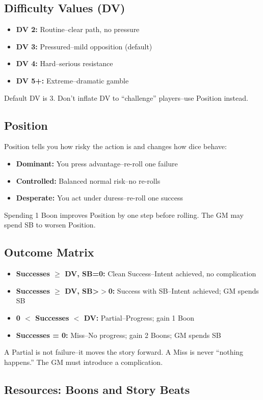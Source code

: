 \subsection{Difficulty Values (DV)}
\begin{itemize}
  \item \textbf{DV 2:} Routine--clear path, no pressure
  \item \textbf{DV 3:} Pressured--mild opposition (default)
  \item \textbf{DV 4:} Hard--serious resistance
  \item \textbf{DV 5+:} Extreme--dramatic gamble
\end{itemize}
Default DV is 3. Don't inflate DV to ``challenge'' players--use Position instead.

\subsection{Position}
Position tells you how risky the action is and changes how dice behave:
\begin{itemize}
  \item \textbf{Dominant:} You press advantage--re-roll one failure
  \item \textbf{Controlled:} Balanced normal risk--no re-rolls
  \item \textbf{Desperate:} You act under duress--re-roll one success
\end{itemize}
Spending 1 Boon improves Position by one step before rolling. The GM may spend SB to worsen Position.

\subsection{Outcome Matrix}
\begin{itemize}
  \item \textbf{Successes $\geq$ DV, SB=0:} Clean Success--Intent achieved, no complication
  \item \textbf{Successes $\geq$ DV, SB>$>$0:} Success with SB--Intent achieved; GM spends SB
  \item \textbf{0 $<$ Successes $<$ DV:} Partial--Progress; gain 1 Boon
  \item \textbf{Successes = 0:} Miss--No progress; gain 2 Boons; GM spends SB
\end{itemize}
A Partial is not failure--it moves the story forward. A Miss is never ``nothing happens.'' The GM must introduce a complication.

\subsection{Resources: Boons and Story Beats}
